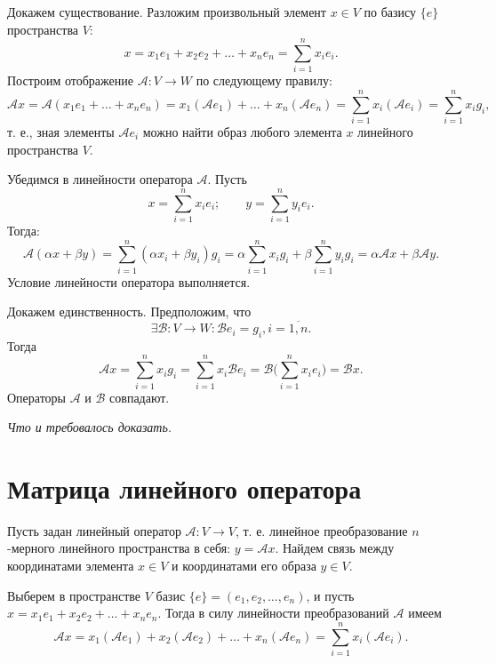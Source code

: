\documentclass[a5paper, 11pt]{extbook}
\theoremstyle{definition}
\theoremstyle{definition}
\newcommand{\newpar}{$ $\par\nobreak\ignorespaces}
\renewenvironment{proof}{{\noindent\bfseries Доказательство.}}{\smallskip\newpar \hfill\textit{Что и требовалось доказать.}}
\begin{document}
\begin{proof}
    Докажем существование. Разложим произвольный элемент \(x \in V\) по базису \(\{e\}\) пространства \(V\):
    \[
        x = x_1 e_1 + x_2 e_2 + \ldots + x_n e_n = \sum_{i = 1}^n x_i e_i.
    \]
    Построим отображение \(\mathcal{A}: V \to W\) по следующему правилу:
    \[
        \mathcal{A} x =
        \mathcal{A} (x_1 e_1 + \ldots + x_n e_n) =
        x_1 (\mathcal{A} e_1) + \ldots + x_n (\mathcal{A} e_n) =
        \sum_{i = 1}^n x_i (\mathcal{A} e_i) = \sum_{i = 1}^n x_i g_i,
    \]
    т. е., зная элементы \(\mathcal{A} e_i\) можно найти образ любого элемента \(x\) линейного пространства \(V\).

    Убедимся в линейности оператора \(\mathcal{A}\). Пусть
    \[
        x = \sum_{i = 1}^n x_i e_i;
        \qquad
        y = \sum_{i = 1}^n y_i e_i.
    \]
    Тогда:
    \[
        \mathcal{A} (\alpha x + \beta y) =
        \sum_{i = 1}^n (\alpha x_i + \beta y_i) g_i =
        \alpha \sum_{i = 1}^n x_i g_i + \beta \sum_{i = 1}^n y_i g_i =
        \alpha \mathcal{A} x + \beta \mathcal{A} y.
    \]
    Условие линейности оператора выполняется.

    Докажем единственность. Предположим, что
    \[
        \exists \mathcal{B}: V \to W : \mathcal{B} e_i = g_i, i = \overline{1, n}.
    \]
    Тогда
    \[
        \mathcal{A} x =
        \sum_{i = 1}^n x_i g_i =
        \sum_{i = 1}^n x_i \mathcal{B} e_i =
        \mathcal{B} \Big( \sum_{i = 1}^n x_i e_i \Big) =
        \mathcal{B} x.
    \]
    Операторы \(\mathcal{A}\) и \(\mathcal{B}\) совпадают.
\end{proof}

\section{Матрица линейного оператора}

Пусть задан линейный оператор \(\mathcal{A}: V \to V\), т. е. линейное преобразование \(n\)-мерного линейного пространства в себя: \(y = \mathcal{A} x\). Найдем связь между координатами элемента \(x \in V\) и координатами его образа \(y \in V\).

Выберем в пространстве \(V\) базис \(\{e\} = (e_1, e_2, \ldots, e_n)\), и пусть \(x = x_1 e_1 + x_2 e_2 + \ldots + x_n e_n\). Тогда в силу линейности преобразований \(\mathcal{A}\) имеем
\[
    \mathcal{A} x =
    x_1 (\mathcal{A} e_1) + x_2 (\mathcal{A} e_2) + \ldots + x_n (\mathcal{A} e_n) =
    \sum_{i = 1}^n x_i (\mathcal{A} e_i).
\]
\end{document}
